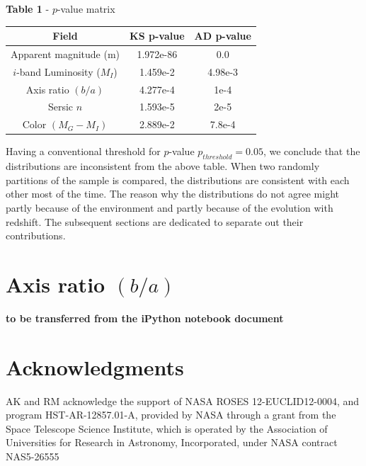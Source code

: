 \documentclass[twocolumn,useAMS,usenatbib]{mn2e}
\newcommand{\mi}{\ensuremath{M_I}}
\newcommand{\sersicn}{Sersic $n$}
\begin{document}
{\bf Table 1 } - $p$-value matrix 
\begin{tabular}{||c|c|c||}
 \hline
  Field & KS p-value & AD p-value \\
 \hline 
  Apparent magnitude (m) & 1.972e-86 & 0.0 \\
  $i$-band Luminosity (\mi) & 1.459e-2 & 4.98e-3 \\
  Axis ratio $(b/a)$ & 4.277e-4 & 1e-4\\
  \sersicn & 1.593e-5 & 2e-5\\
  Color $(M_G-M_I)$ & 2.889e-2 & 7.8e-4\\
  
\end{tabular}

Having a conventional threshold for $p$-value $p_{threshold} = 0.05$, we conclude that the distributions are inconsistent from the above table.
When two randomly partitions of the sample is compared, the distributions are consistent with each other most of the time. The reason why the distributions
do not agree might partly because of the environment and partly because of the evolution with redshift. The subsequent sections are dedicated to separate out
their contributions.



% 

\section{Axis ratio $(b/a)$}

{\bf to be transferred from the iPython notebook document}

\section*{Acknowledgments}

AK and RM acknowledge the support of NASA ROSES 12-EUCLID12-0004, and
program HST-AR-12857.01-A, provided by NASA through a grant from the
Space Telescope Science Institute, which is operated by the
Association of Universities for Research in Astronomy, Incorporated,
under NASA contract NAS5-26555
\end{document}
